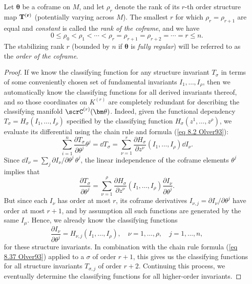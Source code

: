 \begin{prop}\label{prop 8.18 Olver93}
    Let $\bm\theta$ be a coframe on $M$, and let $\rho_r$ denote the rank of its $r$-th order structure map $\bf{T}^{(r)}$ (potentially varying across $M$). The smallest $r$ for which $\rho_r=\rho_{r+1}$ are equal and \emph{constant} is called the \emph{rank of the coframe}, and we have 
    \[0\leq \rho_0< \rho_1< \cdots <\rho_r=\rho_{r+1}=\rho_{r+2}=\cdots=r\leq n.\] 
    The stabilizing rank $r$ (bounded by $n$ if $\bm\theta$ is \emph{fully regular}) will be referred to as the \emph{order of the coframe}.  
\end{prop}
\begin{proof}
    If we know the classifying function for any structure invariant $T_\sigma$ in terms of some conveniently chosen set of fundamental invariants $I_1,\ldots,I_\rho$, then we automatically know the classifying functions for all derived invariants thereof, and so those coordinates on $K^{(r)}$ are completely redundant for describing the classifying manifold $\scrC^{(r)}(\bm\theta)$. Indeed, given the functional dependency $T_\sigma=H_\sigma(I_1,\ldots,I_\rho)$ specified by the classifying function $H_\sigma(z^1,\ldots,z^\rho)$, we evaluate its differential using the chain rule and formula (\ref{eq 8.2 Olver93}):
    \[\sum_{i=1}^n\frac{\partial T_\sigma}{\partial\theta^j}\theta^j=\dd T_\sigma=\sum_{\nu=1}^r \frac{\partial H_\sigma}{\partial z^\nu}(I_1,\ldots,I_\rho)\dd I_\nu.\]
    Since $\dd I_\nu=\sum_j \partial I_\nu/\partial\theta^j\, \theta^j$, the linear independence of the coframe elements $\theta^j$ implies that 
    \[\frac{\partial T_\sigma}{\partial\theta^j}=\sum_{\nu=1}^\rho\frac{\partial H_\sigma}{\partial z^\nu}(I_1,\ldots,I_\rho)\frac{\partial I_\nu}{\partial\theta^j}.\label{eq 8.37 Olver93}\]
    But since each $I_\nu$ has order at most $r$, its coframe derivatives $I_{\nu,j}=\partial I_\nu/\partial\theta^j$ have order at most $r+1$, and by assumption all such functions are generated by the same $I_\mu$. Hence, we already know the classifying functions
    \[\frac{\partial I_\nu}{\partial \theta^j}=H_{\nu,j}(I_1,\ldots,I_\rho),\quad \nu=1,\ldots,\rho,\quad j=1,\ldots,n,\]
    for these structure invariants. In combination with the chain rule formula (\ref{eq 8.37 Olver93}) applied to a $\sigma$ of order $r+1$, this gives us the classifying functions for all structure invariants $T_{\sigma,j}$ of order $r+2$. Continuing this process, we eventually determine the classifying functions for all higher-order invariants.
\end{proof}

